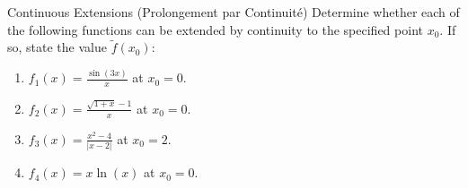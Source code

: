 \begin{exercise}{Continuous Extensions (Prolongement par Continuité)}
Determine whether each of the following functions can be extended by continuity to the specified point $x_0$. If so, state the value $\tilde{f}(x_0)$:
\begin{enumerate}[leftmargin=1.5em,itemsep=2pt]
  \item $f_1(x) = \frac{\sin(3x)}{x}$ at $x_0 = 0$.
  \item $f_2(x) = \frac{\sqrt{1 + x} - 1}{x}$ at $x_0 = 0$.
  \item $f_3(x) = \frac{x^2 - 4}{|x - 2|}$ at $x_0 = 2$.
  \item $f_4(x) = x \ln(x)$ at $x_0 = 0$.
\end{enumerate}
\end{exercise}

\begin{tabletworkspace}[5.0cm]
\end{tabletworkspace}

